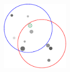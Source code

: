 \documentclass[11pt]{article}
\begin{document}
\begin{figure}[!t]
\setlength{\abovecaptionskip}{0pt}

\centering








\includegraphics[width=0.3\textwidth]{imgs/Fig1_SPC.pdf}


\end{figure}
\end{document}
